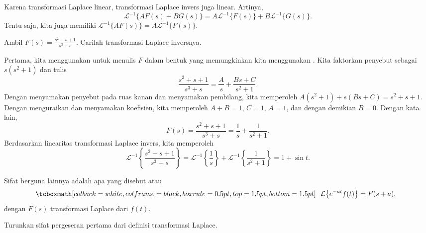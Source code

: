 Karena transformasi Laplace linear, transformasi Laplace
invers juga linear.  Artinya,
\begin{equation*}
{\mathcal{L}}^{-1} \bigl\{ A F(s) + B G(s) \bigr\} =
A {\mathcal{L}}^{-1} \bigl\{ F(s) \bigr\} +
B {\mathcal{L}}^{-1} \bigl\{ G(s) \bigr\} .
\end{equation*}
Tentu saja, kita juga memiliki
${\mathcal{L}}^{-1} \bigl\{ A F(s) \bigr\} =
A {\mathcal{L}}^{-1} \bigl\{ F(s) \bigr\}$.

\begin{example}
Ambil
$F(s) = \frac{s^2+s+1}{s^3+s}$.  Carilah transformasi Laplace inversnya.

Pertama, kita menggunakan \emph{} untuk menulis $F$ dalam bentuk yang
memungkinkan kita menggunakan .  Kita faktorkan penyebut sebagai
$s(s^2+1)$ dan tulis
\begin{equation*}
\frac{s^2+s+1}{s^3+s}
=
\frac{A}{s} + 
\frac{Bs+C}{s^2+1} .
\end{equation*}
Dengan menyamakan penyebut pada ruas kanan
dan menyamakan pembilang, kita memperoleh
$A(s^2+1) + s(Bs+C) = s^2+s+1$.  Dengan menguraikan dan menyamakan koefisien,
kita memperoleh $A+B = 1$, $C=1$, $A=1$,
dan dengan demikian $B=0$.  Dengan
kata lain,
\begin{equation*}
F(s) =
\frac{s^2+s+1}{s^3+s}
=
\frac{1}{s} +
\frac{1}{s^2+1} .
\end{equation*}
Berdasarkan linearitas transformasi Laplace invers, kita memperoleh 
\begin{equation*}
{\mathcal{L}}^{-1} \left\{ 
\frac{s^2+s+1}{s^3+s} \right\}
=
{\mathcal{L}}^{-1} \left\{ 
\frac{1}{s} \right\} 
+
{\mathcal{L}}^{-1} \left\{ 
\frac{1}{s^2+1} \right\}
=
1 + 
\sin t .
\end{equation*}
\end{example}

Sifat berguna lainnya adalah apa yang disebut 
\emph{} atau
\emph{}
\begin{equation*}
\mybxbg{~~
\mathcal{L} \bigl\{ e^{-at} f(t) \bigr\} = F(s+a) ,
~~}
\end{equation*}
dengan $F(s)$ transformasi Laplace dari $f(t)$.

\begin{exercise}
Turunkan sifat pergeseran pertama
dari definisi transformasi Laplace.
\end{exercise}

